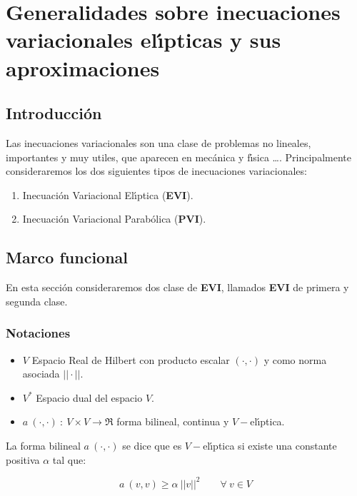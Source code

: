 %

\chapter{Generalidades sobre inecuaciones variacionales el\'{\i}pticas y sus
aproximaciones}

\section{Introducci\'on}

Las inecuaciones variacionales son una clase de problemas no lineales, 
importantes y muy utiles, que aparecen en mec\'anica y f\'{\i}sica \dots.
Principalmente consideraremos los dos siguientes tipos de inecuaciones
variacionales:

\begin{enumerate}
\item Inecuaci\'on Variacional El\'{\i}ptica (\textbf{EVI}).
\item Inecuaci\'on Variacional Parab\'olica (\textbf{PVI}).
\end{enumerate}

\section{Marco funcional}

En esta secci\'on consideraremos dos clase de \textbf{EVI}, llamados
\textbf{EVI} de primera y segunda clase.

\subsection{Notaciones}

\begin{itemize}
\item $V$ Espacio Real de Hilbert con producto escalar $(\cdot ,\cdot )$
y como norma asociada $||\cdot||$.
\item $V^*$ Espacio dual del espacio $V$.
\item $a\ (\cdot ,\cdot )\ : \ V \times V \longrightarrow \Re $ forma
bilineal, continua y $V-$el\'{\i}ptica.
\end{itemize}

La forma bilineal $a\ (\cdot ,\cdot )$ se dice que es
$V-$el\'{\i}ptica si existe una constante positiva $\alpha $ tal que:

\begin{displaymath}
a \ (v,v) \ge \alpha \ ||v||^2 \qquad \forall \ v \in V
\end{displaymath}

